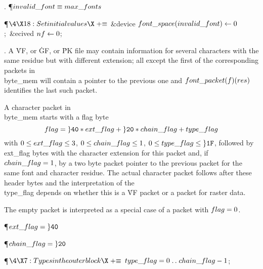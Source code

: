 . \P\D {}$\\{invalid\_font}\S\\{max\_fonts}$\par
\Y\P$\4\X18:Set initial values\X\mathrel{+}\S$\6
\&{device} $\\{font\_space}(\\{invalid\_font})\K0$;\ \&{ecived}\6
$\\{nf}\K0$;\par
\fi

. A \.{VF}, or \.{GF}, or \.{PK} file may contain information for
several characters with the same residue but with different extension;
all except the first of the corresponding packets in \\{byte\_mem} will
contain a pointer to the previous one and $\\{font\_packet}(\|f)(\\{res})$
identifies the last such packet.

A character packet in \\{byte\_mem} starts with a flag byte
$$\hbox{$\\{flag}=\H{40}\ast\\{ext\_flag}+\H{20}\ast\\{chain\_flag}+\\{type%
\_flag}$}$$
with $0\L\\{ext\_flag}\L3$, $0\L\\{chain\_flag}\L1$, $0\L\\{type\_flag}\L%
\H{1F}$,
followed by \\{ext\_flag} bytes with the character extension for this
packet and, if $\\{chain\_flag}=1$, by a two byte packet pointer to the
previous packet for the same font and character residue. The actual
character packet follows after these header bytes and the
interpretation of the \\{type\_flag} depends on whether this is a \.{VF}
packet or a packet for raster data.

The empty packet is interpreted as a special case of a packet with
$\\{flag}=0$.

\Y\P\D {}$\\{ext\_flag}=\H{40}$\par
\P\D {}$\\{chain\_flag}=\H{20}$\par
\Y\P$\4\X7:Types in the outer block\X\mathrel{+}\S$\6
$\\{type\_flag}=0\to\\{chain\_flag}-1$;\par
\fi

